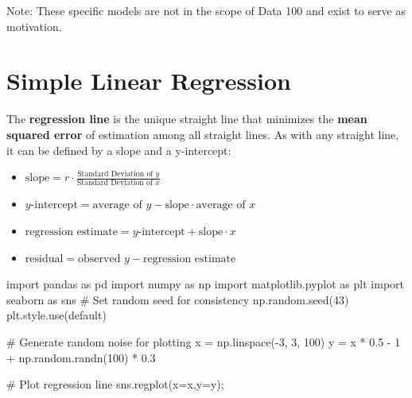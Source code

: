 \documentclass[
  letterpaper,
  DIV=11,
  numbers=noendperiod]{scrreprt}
\newenvironment{Shaded}{\begin{snugshade}}{\end{snugshade}}
\newcommand{\CommentTok}[1]{\textcolor[rgb]{0.37,0.37,0.37}{#1}}
\newcommand{\DecValTok}[1]{\textcolor[rgb]{0.68,0.00,0.00}{#1}}
\newcommand{\FloatTok}[1]{\textcolor[rgb]{0.68,0.00,0.00}{#1}}
\newcommand{\ImportTok}[1]{\textcolor[rgb]{0.00,0.46,0.62}{#1}}
\newcommand{\NormalTok}[1]{\textcolor[rgb]{0.00,0.23,0.31}{#1}}
\newcommand{\OperatorTok}[1]{\textcolor[rgb]{0.37,0.37,0.37}{#1}}
\newcommand{\StringTok}[1]{\textcolor[rgb]{0.13,0.47,0.30}{#1}}
\providecommand{\tightlist}{%
  \setlength{\itemsep}{0pt}\setlength{\parskip}{0pt}}\usepackage{longtable,booktabs,array}
\begin{document}
Note: These specific models are not in the scope of Data 100 and exist
to serve as motivation.

\section{Simple Linear Regression}\label{simple-linear-regression}

The \textbf{regression line} is the unique straight line that minimizes
the \textbf{mean squared error} of estimation among all straight lines.
As with any straight line, it can be defined by a slope and a
y-intercept:

\begin{itemize}
\tightlist
\item
  \(\text{slope} = r \cdot \frac{\text{Standard Deviation of } y}{\text{Standard Deviation of }x}\)
\item
  \(y\text{-intercept} = \text{average of }y - \text{slope}\cdot\text{average of }x\)
\item
  \(\text{regression estimate} = y\text{-intercept} + \text{slope}\cdot\text{}x\)
\item
  \(\text{residual} =\text{observed }y - \text{regression estimate}\)
\end{itemize}

\begin{Shaded}
\begin{Highlighting}[]
\ImportTok{import}\NormalTok{ pandas }\ImportTok{as}\NormalTok{ pd}
\ImportTok{import}\NormalTok{ numpy }\ImportTok{as}\NormalTok{ np}
\ImportTok{import}\NormalTok{ matplotlib.pyplot }\ImportTok{as}\NormalTok{ plt}
\ImportTok{import}\NormalTok{ seaborn }\ImportTok{as}\NormalTok{ sns}
\CommentTok{\# Set random seed for consistency }
\NormalTok{np.random.seed(}\DecValTok{43}\NormalTok{)}
\NormalTok{plt.style.use(}\StringTok{\textquotesingle{}default\textquotesingle{}}\NormalTok{) }

\CommentTok{\# Generate random noise for plotting}
\NormalTok{x }\OperatorTok{=}\NormalTok{ np.linspace(}\OperatorTok{{-}}\DecValTok{3}\NormalTok{, }\DecValTok{3}\NormalTok{, }\DecValTok{100}\NormalTok{)}
\NormalTok{y }\OperatorTok{=}\NormalTok{ x }\OperatorTok{*} \FloatTok{0.5} \OperatorTok{{-}} \DecValTok{1} \OperatorTok{+}\NormalTok{ np.random.randn(}\DecValTok{100}\NormalTok{) }\OperatorTok{*} \FloatTok{0.3}

\CommentTok{\# Plot regression line}
\NormalTok{sns.regplot(x}\OperatorTok{=}\NormalTok{x,y}\OperatorTok{=}\NormalTok{y)}\OperatorTok{;}
\end{Highlighting}
\end{Shaded}
\end{document}
